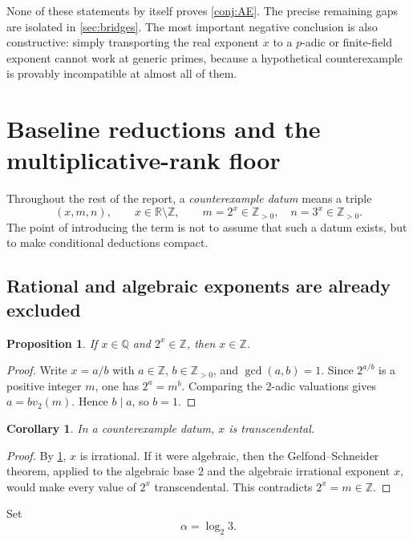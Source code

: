 \documentclass[11pt,oneside]{article}
\newtheorem{proposition}[theorem]{Proposition}
\newtheorem{corollary}[theorem]{Corollary}
\theoremstyle{definition}
\theoremstyle{remark}
\newcommand{\Q}{\mathbb{Q}}
\newcommand{\R}{\mathbb{R}}
\newcommand{\Z}{\mathbb{Z}}
\begin{document}
None of these statements by itself proves \cref{conj:AE}.  The precise
remaining gaps are isolated in \cref{sec:bridges}.  The most important
negative conclusion is also constructive: simply transporting the real
exponent $x$ to a $p$-adic or finite-field exponent cannot work at generic
primes, because a hypothetical counterexample is provably incompatible at
almost all of them.

\section{Baseline reductions and the multiplicative-rank floor}\label{sec:baseline}

Throughout the rest of the report, a \emph{counterexample datum} means a
triple
\[
 (x,m,n),\qquad x\in\R\setminus\Z,\qquad m=2^x\in\Z_{>0},\quad
 n=3^x\in\Z_{>0}.
\]
The point of introducing the term is not to assume that such a datum exists,
but to make conditional deductions compact.

\subsection{Rational and algebraic exponents are already excluded}

\begin{proposition}\label{prop:rational-integer}
If $x\in\Q$ and $2^x\in\Z$, then $x\in\Z$.
\end{proposition}

\begin{proof}
Write $x=a/b$ with $a\in\Z$, $b\in\Z_{>0}$, and $\gcd(a,b)=1$.  Since
$2^{a/b}$ is a positive integer $m$, one has $2^a=m^b$.  Comparing the
$2$-adic valuations gives $a=bv_2(m)$.  Hence $b\mid a$, so $b=1$.
\end{proof}

\begin{corollary}\label{cor:x-transcendental}
In a counterexample datum, $x$ is transcendental.
\end{corollary}

\begin{proof}
By \cref{prop:rational-integer}, $x$ is irrational.  If it were algebraic,
then the Gelfond--Schneider theorem, applied to the algebraic base $2$ and
the algebraic irrational exponent $x$, would make every value of $2^x$
transcendental.  This contradicts $2^x=m\in\Z$.
\end{proof}

Set
\[
 \alpha=\log_2 3.
\]
\end{document}
